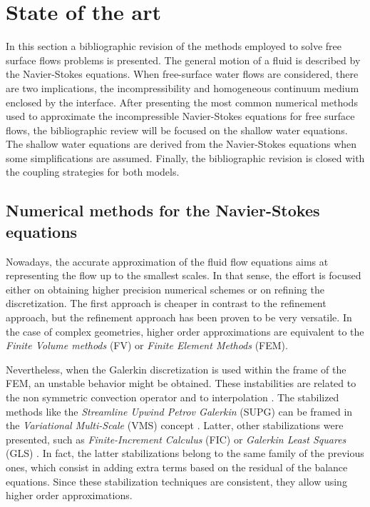 
\section{State of the art}
\label{state_art}


In this section a bibliographic revision of the methods employed to solve free surface flows problems is presented.
The general motion of a fluid is described by the Navier-Stokes equations. When free-surface water flows are considered, there are two implications, the incompressibility and homogeneous continuum medium enclosed by the interface. After presenting the most common numerical methods used to approximate the incompressible Navier-Stokes equations for free surface flows, the bibliographic review will be focused on the shallow water equations.
The shallow water equations are derived from the Navier-Stokes equations when some simplifications are assumed.
Finally, the bibliographic revision is closed with the coupling strategies for both models.



\subsection{Numerical methods for the Navier-Stokes equations}


Nowadays, the accurate approximation of the fluid flow equations aims at representing the flow up to the smallest scales. In that sense, the effort is focused either on obtaining higher precision numerical schemes or on refining the discretization. The first approach is cheaper in contrast to the refinement approach, but the refinement approach has been proven to be very versatile. In the case of complex geometries, higher order approximations are equivalent to the \emph{Finite Volume methods} (FV) or \emph{Finite Element Methods} (FEM).

Nevertheless, when the Galerkin discretization is used within the frame of the FEM, an unstable behavior might be obtained. These instabilities are related to the non symmetric convection operator and to interpolation \cite{brezzi1991,codina2008oseen}. The stabilized methods like the \emph{Streamline Upwind Petrov Galerkin} (SUPG) \cite{hughes1986iii,brooks1982} can be framed in the \emph{Variational Multi-Scale} (VMS) concept \cite{hughes1995}. Latter, other stabilizations were presented, such as \emph{Finite-Increment Calculus} (FIC) \cite{onate1998} or \emph{Galerkin Least Squares} (GLS) \cite{hughes1989}. In fact, the latter stabilizations belong to the same family of the previous ones, which consist in adding extra terms based on the residual of the balance equations. Since these stabilization techniques are consistent, they allow using higher order approximations.

